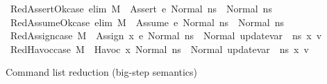 \begin{isabellebody}
\isanewline
{}\isamarkupfalse%
\ RedAssertOk{\isacharunderscore}{\kern0pt}case\ {\isacharbrackleft}{\kern0pt}elim{\isacharbrackright}{\kern0pt}{\isacharcolon}{\kern0pt}\ {\isachardoublequoteopen}M{\isacharcomma}{\kern0pt}{\isasymLambda}{\isacharcomma}{\kern0pt}{\isasymGamma}{\isacharcomma}{\kern0pt}{\isasymOmega}\ {\isasymturnstile}\ {\isasymlangle}Assert\ e{\isacharcomma}{\kern0pt}\ Normal\ n{\isacharunderscore}{\kern0pt}s{\isasymrangle}\ {\isasymrightarrow}\ Normal\ n{\isacharunderscore}{\kern0pt}s{\isachardoublequoteclose}\isanewline
{}\isamarkupfalse%
\ RedAssumeOk{\isacharunderscore}{\kern0pt}case\ {\isacharbrackleft}{\kern0pt}elim{\isacharbrackright}{\kern0pt}{\isacharcolon}{\kern0pt}\ {\isachardoublequoteopen}M{\isacharcomma}{\kern0pt}{\isasymLambda}{\isacharcomma}{\kern0pt}{\isasymGamma}{\isacharcomma}{\kern0pt}{\isasymOmega}\ {\isasymturnstile}\ {\isasymlangle}Assume\ e{\isacharcomma}{\kern0pt}\ Normal\ n{\isacharunderscore}{\kern0pt}s{\isasymrangle}\ {\isasymrightarrow}\ Normal\ n{\isacharunderscore}{\kern0pt}s{\isachardoublequoteclose}\isanewline
{}\isamarkupfalse%
\ RedAssign{\isacharunderscore}{\kern0pt}case{\isacharcolon}{\kern0pt}\ {\isachardoublequoteopen}M{\isacharcomma}{\kern0pt}{\isasymLambda}{\isacharcomma}{\kern0pt}{\isasymGamma}{\isacharcomma}{\kern0pt}{\isasymOmega}\ {\isasymturnstile}\ {\isasymlangle}Assign\ x\ e{\isacharcomma}{\kern0pt}\ Normal\ n{\isacharunderscore}{\kern0pt}s{\isasymrangle}\ {\isasymrightarrow}\ Normal\ {\isacharparenleft}{\kern0pt}update{\isacharunderscore}{\kern0pt}var\ {\isasymLambda}\ n{\isacharunderscore}{\kern0pt}s\ x\ v{\isacharparenright}{\kern0pt}{\isachardoublequoteclose}\isanewline
{}\isamarkupfalse%
\ RedHavoc{\isacharunderscore}{\kern0pt}case{\isacharcolon}{\kern0pt}\ {\isachardoublequoteopen}M{\isacharcomma}{\kern0pt}{\isasymLambda}{\isacharcomma}{\kern0pt}{\isasymGamma}{\isacharcomma}{\kern0pt}{\isasymOmega}\ {\isasymturnstile}\ {\isasymlangle}Havoc\ x{\isacharcomma}{\kern0pt}\ Normal\ n{\isacharunderscore}{\kern0pt}s{\isasymrangle}\ {\isasymrightarrow}\ Normal\ {\isacharparenleft}{\kern0pt}update{\isacharunderscore}{\kern0pt}var\ {\isasymLambda}\ n{\isacharunderscore}{\kern0pt}s\ x\ v{\isacharparenright}{\kern0pt}{\isachardoublequoteclose}%
\begin{isamarkuptext}%
Command list reduction (big-step semantics)%
\end{isamarkuptext}\isamarkuptrue%

\end{isabellebody}
